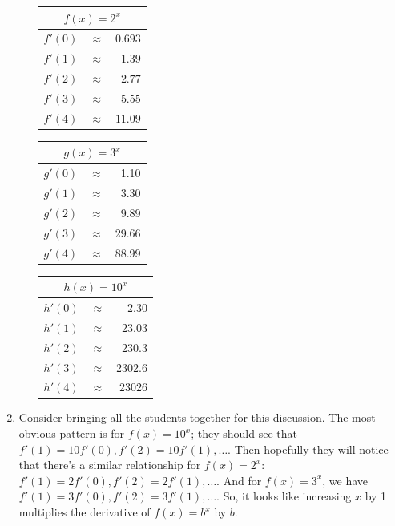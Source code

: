 \documentclass{article}
\begin{document}
\begin{enumerate}
\begin{enumerate}
        \begin{solution}

       \begin{center}
      \renewcommand{\arraystretch}{1.25}
      \begin{tabular}{rcr}
        \multicolumn{3}{c}{$f(x) = 2^x$} \\
        \hline
        $f'(0)$ & $\approx$ & $ 0.693$ \\
        $f'(1)$ & $\approx$ & $ 1.39$ \\
        $f'(2)$ & $\approx$ & $ 2.77$ \\
        $f'(3)$ & $\approx$ & $ 5.55$ \\
        $f'(4)$ & $\approx$ & $ 11.09$ 
      \end{tabular}
      \hspace{0.5in}
      \begin{tabular}{rcr}
        \multicolumn{3}{c}{$ {g(x) = 3^x}$} \\
        \hline
        $g'(0)$ & $\approx$ & 1.10 \\
        $g'(1)$ & $\approx$ &3.30 \\
        $g'(2)$ & $\approx$ &9.89 \\
        $g'(3)$ & $\approx$ &29.66 \\
        $g'(4)$ & $\approx$ &88.99 
      \end{tabular}
      \hspace{0.5in}
      \begin{tabular}{rcr}
        \multicolumn{3}{c}{$ {h(x) = 10^x}$} \\
        \hline
        $h'(0)$ & $\approx$ &2.30 \\
        $h'(1)$ & $\approx$ & 23.03\\
        $h'(2)$ & $\approx$ & 230.3\\
        $h'(3)$ & $\approx$ &2302.6 \\
        $h'(4)$ & $\approx$ &23026 
      \end{tabular}
    \end{center}
      \end{solution}

  \end{enumerate}

\item  \label{prep-for-deriv-of-exp}

  \begin{workshop}
    Consider bringing all the students together for this discussion. The most obvious pattern is for $f(x) = 10^x$; they should see that $f'(1) = 10 f'(0), f'(2) = 10 f'(1), \ldots$. Then hopefully they will notice that there's a similar relationship for $f(x) = 2^x$: $f'(1) = 2 f'(0), f'(2) = 2 f'(1), \ldots$. And for $f(x) = 3^x$, we have $f'(1) = 3 f'(0), f'(2) = 3 f'(1), \ldots$. So, it looks like increasing $x$ by 1 multiplies the derivative of $f(x) = b^x$ by $b$. 


\end{workshop}
\end{enumerate}
\end{document}
